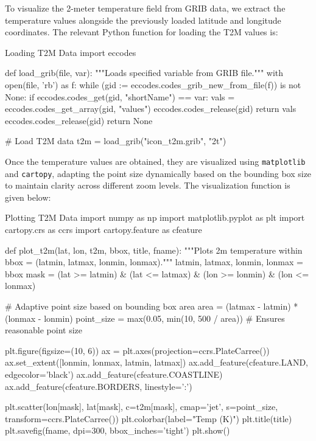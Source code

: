 To visualize the 2-meter temperature field from GRIB data, we extract the temperature values alongside the previously loaded latitude and longitude coordinates. The relevant Python function for loading the T2M values is:

\begin{codeonly}{Loading T2M Data}
import eccodes

def load_grib(file, var):
    """Loads specified variable from GRIB file."""
    with open(file, 'rb') as f:
        while (gid := eccodes.codes_grib_new_from_file(f)) is not None:
            if eccodes.codes_get(gid, "shortName") == var:
                vals = eccodes.codes_get_array(gid, "values")
                eccodes.codes_release(gid)
                return vals
            eccodes.codes_release(gid)
    return None

# Load T2M data
t2m = load_grib("icon_t2m.grib", "2t")
\end{codeonly}

Once the temperature values are obtained, they are visualized using \texttt{matplotlib} and \texttt{cartopy}, adapting the point size dynamically based on the bounding box size to maintain clarity across different zoom levels. The visualization function is given below:

\begin{codeonly}{Plotting T2M Data}
import numpy as np
import matplotlib.pyplot as plt
import cartopy.crs as ccrs
import cartopy.feature as cfeature

def plot_t2m(lat, lon, t2m, bbox, title, fname):
    """Plots 2m temperature within bbox = (latmin, latmax, lonmin, lonmax)."""
    latmin, latmax, lonmin, lonmax = bbox
    mask = (lat >= latmin) & (lat <= latmax) & (lon >= lonmin) & (lon <= lonmax)
    
    # Adaptive point size based on bounding box area
    area = (latmax - latmin) * (lonmax - lonmin)
    point_size = max(0.05, min(10, 500 / area))  # Ensures reasonable point size
    
    plt.figure(figsize=(10, 6))
    ax = plt.axes(projection=ccrs.PlateCarree())
    ax.set_extent([lonmin, lonmax, latmin, latmax])
    ax.add_feature(cfeature.LAND, edgecolor='black')
    ax.add_feature(cfeature.COASTLINE)
    ax.add_feature(cfeature.BORDERS, linestyle=':')

    plt.scatter(lon[mask], lat[mask], c=t2m[mask], cmap='jet', s=point_size, transform=ccrs.PlateCarree())
    plt.colorbar(label="Temp (K)")
    plt.title(title)
    plt.savefig(fname, dpi=300, bbox_inches='tight')
    plt.show()
\end{codeonly}

